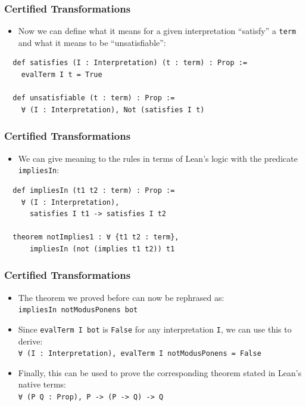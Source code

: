 \documentclass[usepdftitle=false,aspectratio=169,usenames,dvipsnames]{beamer}
\newcommand\vitem{\vfill\item}
\begin{document}
\begin{frame}[fragile]
  \frametitle{Certified Transformations}
  \begin{itemize}
    \item Now we can define what it means for a given interpretation ``satisfy'' a \texttt{term} and what it means to be ``unsatisfiable'':
  \end{itemize}
  \vfill
  \begin{verbatim}
  def satisfies (I : Interpretation) (t : term) : Prop :=
    evalTerm I t = True

  def unsatisfiable (t : term) : Prop :=
    ∀ (I : Interpretation), Not (satisfies I t)
  \end{verbatim}
\end{frame}

\begin{frame}[fragile]
  \frametitle{Certified Transformations}
  \begin{itemize}
    \item We can give meaning to the rules in terms of Lean's logic with the predicate \texttt{impliesIn}:
  \end{itemize}
  \vfill
  \begin{verbatim}
  def impliesIn (t1 t2 : term) : Prop :=
    ∀ (I : Interpretation),
      satisfies I t1 -> satisfies I t2

  theorem notImplies1 : ∀ {t1 t2 : term},
      impliesIn (not (implies t1 t2)) t1
  \end{verbatim}
\end{frame}

\begin{frame}
  \frametitle{Certified Transformations}
  \begin{itemize}
    \item The theorem we proved before can now be rephrased as:\\ \texttt{impliesIn notModusPonens bot}
    \vitem Since \texttt{evalTerm I bot} is \texttt{False} for any interpretation \texttt{I}, we can use this to derive:\\ \texttt{∀ (I : Interpretation), evalTerm I notModusPonens = False}
    \vitem Finally, this can be used to prove the corresponding theorem stated in Lean's native terms:\\
    \texttt{∀ (P Q : Prop), P -> (P -> Q) -> Q}
  \end{itemize}
\end{frame}
\end{document}
